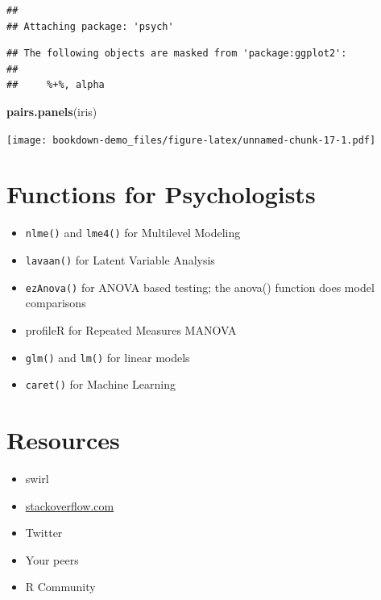 \documentclass[]{book}
\newenvironment{Shaded}{\begin{snugshade}}{\end{snugshade}}
\newcommand{\KeywordTok}[1]{\textcolor[rgb]{0.13,0.29,0.53}{\textbf{#1}}}
\newcommand{\NormalTok}[1]{#1}
\providecommand{\tightlist}{%
  \setlength{\itemsep}{0pt}\setlength{\parskip}{0pt}}
\theoremstyle{definition}
\theoremstyle{definition}
\theoremstyle{definition}
\theoremstyle{remark}
\begin{document}
\begin{verbatim}
## 
## Attaching package: 'psych'
\end{verbatim}

\begin{verbatim}
## The following objects are masked from 'package:ggplot2':
## 
##     %+%, alpha
\end{verbatim}

\begin{Shaded}
\begin{Highlighting}[]
\KeywordTok{pairs.panels}\NormalTok{(iris)}
\end{Highlighting}
\end{Shaded}

\texttt{[image: bookdown-demo\_files/figure-latex/unnamed-chunk-17-1.pdf]}

\section{Functions for Psychologists}\label{functions-for-psychologists}

\begin{itemize}
\tightlist
\item
  \texttt{nlme()} and \texttt{lme4()} for Multilevel Modeling
\item
  \texttt{lavaan()} for Latent Variable Analysis
\item
  \texttt{ezAnova()} for ANOVA based testing; the anova() function does
  model comparisons
\item
  profileR for Repeated Measures MANOVA
\item
  \texttt{glm()} and \texttt{lm()} for linear models
\item
  \texttt{caret()} for Machine Learning
\end{itemize}

\section{Resources}\label{resources}

\begin{itemize}
\tightlist
\item
  swirl
\item
  \href{www.stackoverflow.com}{stackoverflow.com}
\item
  Twitter
\item
  Your peers
\item
  R Community
\end{itemize}
\end{document}
